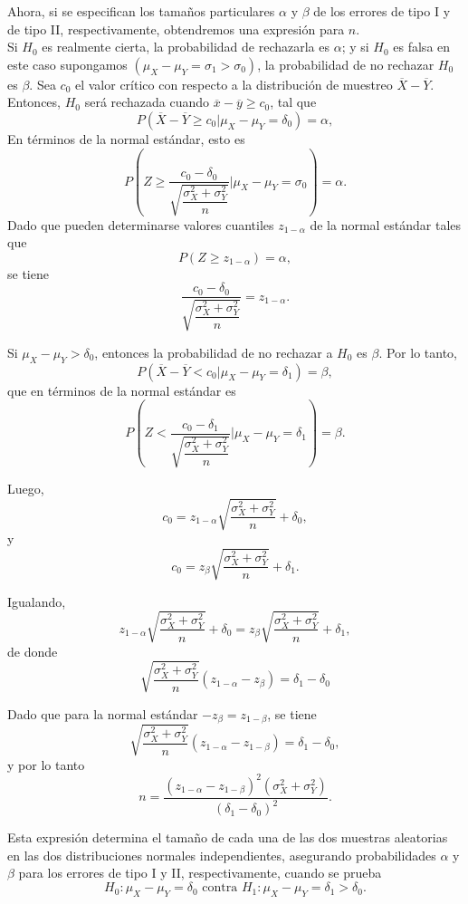 Ahora, si se especifican los tamaños particulares $\alpha$ y $\beta$ de los errores de tipo I y de tipo II, respectivamente, obtendremos una expresión para $n$.\\
Si $H_0$ es realmente cierta, la probabilidad de rechazarla es $\alpha$; y si $H_0$ es falsa en este caso supongamos $(\mu_X-\mu_Y=\sigma_1>\sigma_0)$, la probabilidad de no rechazar $H_0$ es $\beta$. Sea $c_0$ el valor crítico con respecto a la distribución de muestreo $\overline{X}-\overline{Y}$. Entonces, $H_0$ será rechazada cuando $\overline{x}-\overline{y}\geq c_0$, tal que
$$P(\overline{X}-\overline{Y}\geq c_0 | \mu_X-\mu_Y=\delta_0)=\alpha,$$
En términos de la normal estándar, esto es
$$P\left(Z\geq \dfrac{c_0-\delta_0}{\sqrt{\dfrac{\sigma_X^2+\sigma_Y^2}{n}}}\Bigg| \mu_X-\mu_Y=\sigma_0\right)=\alpha.$$
Dado que pueden determinarse valores cuantiles $z_{1-\alpha}$ de la normal estándar tales que
$$P(Z\geq z_{1-\alpha})=\alpha,$$
se tiene
$$\dfrac{c_0-\delta_0}{\sqrt{\dfrac{\sigma_X^2+\sigma_Y^2}{n}}}=z_{1-\alpha}.$$

Si $\mu_X-\mu_Y>\delta_0$, entonces la probabilidad de no rechazar a $H_0$ es $\beta$. Por lo tanto,
$$P(\overline{X}-\overline{Y}<c_0|\mu_X-\mu_Y=\delta_1)=\beta,$$
que en términos de la normal estándar es
$$P\left(Z<\dfrac{c_0-\delta_1}{\sqrt{\dfrac{\sigma_X^2+\sigma_Y^2}{n}}}\Bigg|\mu_X-\mu_Y=\delta_1\right)=\beta.$$

Luego, 
$$c_0=z_{1-\alpha}\sqrt{\dfrac{\sigma_X^2+\sigma_Y^2}{n}}+\delta_0,$$
y
$$c_0=z_\beta\sqrt{\dfrac{\sigma_X^2+\sigma_Y^2}{n}}+\delta_1.$$

Igualando,
$$z_{1-\alpha}\sqrt{\dfrac{\sigma_X^2+\sigma_Y^2}{n}}+\delta_0=z_\beta\sqrt{\dfrac{\sigma_X^2+\sigma_Y^2}{n}}+\delta_1,$$
de donde
$$\sqrt{\dfrac{\sigma_X^2+\sigma_Y^2}{n}} \left(z_{1-\alpha}-z_\beta\right)= \delta_1-\delta_0$$

Dado que para la normal estándar $-z_\beta=z_{1-\beta}$, se tiene
$$\sqrt{\dfrac{\sigma_X^2+\sigma_Y^2}{n}} \left(z_{1-\alpha}-z_{1-\beta}\right)= \delta_1-\delta_0,$$
y por lo tanto
$$n=\dfrac{\left(z_{1-\alpha}-z_{1-\beta}\right)^2\left(\sigma_X^2+\sigma_Y^2\right)}{\left(\delta_1-\delta_0\right)^2}.$$

Esta expresión determina el tamaño de cada una de las dos muestras aleatorias en las dos distribuciones normales independientes, asegurando probabilidades $\alpha$ y $\beta$ para los errores de tipo I y II, respectivamente, cuando se prueba
$$H_0:\mu_X-\mu_Y=\delta_0 \mbox{ contra } H_1:\mu_X-\mu_Y=\delta_1>\delta_0.$$\\


